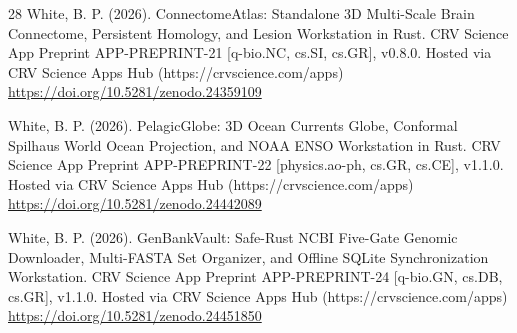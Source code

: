 \documentclass[10pt,letterpaper]{article}
\begin{document}
\begin{thebibliography}{28}
 White, B. P. (2026). ConnectomeAtlas: Standalone 3D Multi-Scale Brain Connectome, Persistent Homology, and Lesion Workstation in Rust. CRV Science App Preprint APP-PREPRINT-21 [q-bio.NC, cs.SI, cs.GR], v0.8.0. Hosted via CRV Science Apps Hub (https://crvscience.com/apps) \url{https://doi.org/10.5281/zenodo.24359109}

 White, B. P. (2026). PelagicGlobe: 3D Ocean Currents Globe, Conformal Spilhaus World Ocean Projection, and NOAA ENSO Workstation in Rust. CRV Science App Preprint APP-PREPRINT-22 [physics.ao-ph, cs.GR, cs.CE], v1.1.0. Hosted via CRV Science Apps Hub (https://crvscience.com/apps) \url{https://doi.org/10.5281/zenodo.24442089}

 White, B. P. (2026). GenBankVault: Safe-Rust NCBI Five-Gate Genomic Downloader, Multi-FASTA Set Organizer, and Offline SQLite Synchronization Workstation. CRV Science App Preprint APP-PREPRINT-24 [q-bio.GN, cs.DB, cs.GR], v1.1.0. Hosted via CRV Science Apps Hub (https://crvscience.com/apps) \url{https://doi.org/10.5281/zenodo.24451850}
\end{thebibliography}
\end{document}
